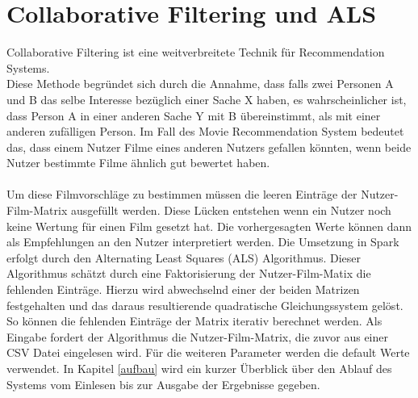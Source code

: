\chapter{Collaborative Filtering und ALS}

\glqq Collaborative Filtering\grqq{} ist eine weitverbreitete Technik für \glqq Recommendation Systems\grqq.\\
Diese Methode begründet sich durch die Annahme, dass falls zwei Personen A und B das selbe Interesse bezüglich einer Sache X haben, es wahrscheinlicher ist, dass Person A in einer anderen Sache Y mit B übereinstimmt, als mit einer anderen zufälligen Person. Im Fall des \glqq Movie Recommendation System\grqq{} bedeutet das, dass einem Nutzer Filme eines anderen Nutzers gefallen könnten, wenn beide Nutzer bestimmte Filme ähnlich gut bewertet haben.\\\\
Um diese Filmvorschläge zu bestimmen müssen die leeren Einträge der Nutzer-Film-Matrix ausgefüllt werden. Diese Lücken entstehen wenn ein Nutzer noch keine Wertung für einen Film gesetzt hat. Die vorhergesagten Werte können dann als Empfehlungen an den Nutzer interpretiert werden.
Die Umsetzung in Spark erfolgt durch den \glqq Alternating Least Squares\grqq{} (ALS) Algorithmus. Dieser Algorithmus schätzt durch eine Faktorisierung der Nutzer-Film-Matix die fehlenden Einträge. Hierzu wird abwechselnd einer der beiden Matrizen festgehalten und das daraus resultierende quadratische Gleichungssystem gelöst. So können die fehlenden Einträge der Matrix iterativ berechnet werden.
Als Eingabe fordert der Algorithmus die Nutzer-Film-Matrix, die zuvor aus einer CSV Datei eingelesen wird. Für die weiteren Parameter werden die default Werte verwendet. In Kapitel \ref{aufbau} wird ein kurzer Überblick über den Ablauf des Systems vom Einlesen bis zur Ausgabe der Ergebnisse gegeben.


